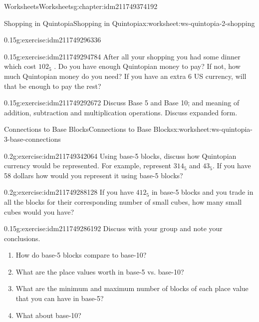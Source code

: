 \documentclass[twoside,11pt,]{book}
\begin{document}
\begin{chapterptx}{Worksheets}{}{Worksheets}{}{}{g:chapter:idm211749374192}
\begin{worksheet-section-numberless}{Shopping in Quintopia}{}{Shopping in Quintopia}{}{}{x:worksheet:ws-quintopia-2-shopping}
\begin{divisionexercise}{4}{}{0.15}{g:exercise:idm211749296336}
\end{divisionexercise}%
\begin{divisionexercise}{5}{}{0.15}{g:exercise:idm211749294784}%
After all your shopping you had some dinner which cost \(102_{5}\) . Do you have enough Quintopian money to pay? If not, how much Quintopian money do you need?  If you have an extra \textdollar{}6 US currency, will that be enough to pay the rest?%
\end{divisionexercise}%
\begin{divisionexercise}{6}{}{0.15}{g:exercise:idm211749292672}%
Discuss Base 5 and Base 10; and meaning of addition, subtraction and multiplication operations. Discuss expanded form.%
\end{divisionexercise}%
\end{worksheet-section-numberless}
\restoregeometry
%
%
\typeout{************************************************}
\typeout{************************************************}
%
\begin{worksheet-section-numberless}{Connections to Base Blocks}{}{Connections to Base Blocks}{}{}{x:worksheet:ws-quintopia-3-base-connections}
\begin{divisionexercise}{1}{}{0.2}{g:exercise:idm211749342064}%
Using base-5 blocks, discuss how Quintopian currency would be represented. For example, represent \(314_{5}\) and \(43_{5}\). If you have \textdollar{}58 dollars how would you represent it using base-5 blocks?%
\end{divisionexercise}%
\begin{divisionexercise}{2}{}{0.2}{g:exercise:idm211749288128}%
If you have \(412_{5}\) in base-5 blocks and you trade in all the blocks for their corresponding number of small cubes, how many small cubes would you have?%
\end{divisionexercise}%
\begin{divisionexercise}{3}{}{0.15}{g:exercise:idm211749286192}%
Discuss with your group and note your conclusions.%
%
\begin{enumerate}[label=(\alph*)]
\item{}How do base-5 blocks compare to base-10?%
\item{}What are the place values worth in base-5 vs. base-10?%
\item{}What are the minimum and maximum number of blocks of each place value that you can have in base-5?%
\item{}What about base-10?%

\end{enumerate}
\end{divisionexercise}
\end{worksheet-section-numberless}
\end{chapterptx}
\end{document}
